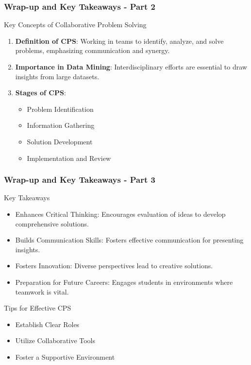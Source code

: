 \documentclass{beamer}
\begin{document}
\begin{frame}[fragile]
    \frametitle{Wrap-up and Key Takeaways - Part 2}
    \begin{block}{Key Concepts of Collaborative Problem Solving}
        \begin{enumerate}
            \item \textbf{Definition of CPS}: Working in teams to identify, analyze, and solve problems, emphasizing communication and synergy. 
            \item \textbf{Importance in Data Mining}: Interdisciplinary efforts are essential to draw insights from large datasets.
            \item \textbf{Stages of CPS}:
                \begin{itemize}
                    \item Problem Identification
                    \item Information Gathering
                    \item Solution Development
                    \item Implementation and Review
                \end{itemize}
        \end{enumerate}
    \end{block}
\end{frame}

\begin{frame}[fragile]
    \frametitle{Wrap-up and Key Takeaways - Part 3}
    \begin{block}{Key Takeaways}
        \begin{itemize}
            \item Enhances Critical Thinking: Encourages evaluation of ideas to develop comprehensive solutions.
            \item Builds Communication Skills: Fosters effective communication for presenting insights.
            \item Fosters Innovation: Diverse perspectives lead to creative solutions.
            \item Preparation for Future Careers: Engages students in environments where teamwork is vital.
        \end{itemize}
    \end{block}

    \begin{block}{Tips for Effective CPS}
        \begin{itemize}
            \item Establish Clear Roles
            \item Utilize Collaborative Tools
            \item Foster a Supportive Environment
        \end{itemize}
    \end{block}
\end{frame}
\end{document}

